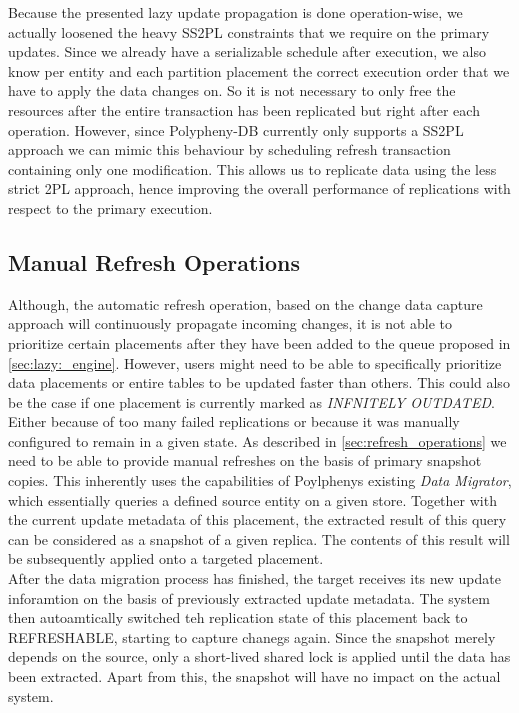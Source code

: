 Because the presented lazy update propagation is done operation-wise, we actually loosened the heavy SS2PL constraints that we require on the primary updates. 
Since we already have a serializable schedule after execution, we also know per entity and each partition placement 
the correct execution order that we have to apply the data changes on. So it is not necessary to only free the resources 
after the entire transaction has been replicated but right after each operation. 
However, since Polypheny-DB currently only supports a SS2PL approach we can 
mimic this behaviour by scheduling refresh transaction containing only one modification.
This allows us to replicate data using the less strict 2PL approach, hence improving the overall performance of replications with respect to the primary execution.



\subsection{Manual Refresh Operations}
\label{sec:manual_refresh}

Although, the automatic refresh operation, based on the change data capture approach will continuously propagate incoming changes,
it is not able to prioritize certain placements after they have been added to the queue proposed in \ref{sec:lazy:_engine}.
However, users might need to be able to specifically prioritize data placements or entire tables to be updated faster than others. 
This could also be the case if one placement is currently marked as \emph{INFNITELY OUTDATED}.
Either because of too many failed replications or because it was manually configured to remain in a given state. 
As described in \ref{sec:refresh_operations} we need to be able to provide manual refreshes on the basis of primary snapshot copies.
This inherently uses the capabilities of Poylphenys existing \emph{Data Migrator}, which essentially queries a defined source entity on a given store. 
Together with the current update metadata of this placement, the extracted result of this query can be considered as a snapshot of a given replica.
The contents of this result will be subsequently applied onto a targeted placement.\\
After the data migration process has finished, the target receives its new update inforamtion on the basis of previously extracted update metadata.
The system then autoamtically switched teh replication state of this placement back to REFRESHABLE, starting to capture chanegs again.
Since the snapshot merely depends on the source, only a short-lived shared lock is applied until the data has been extracted. Apart from this, the snapshot will have no impact
on the actual system.\\


